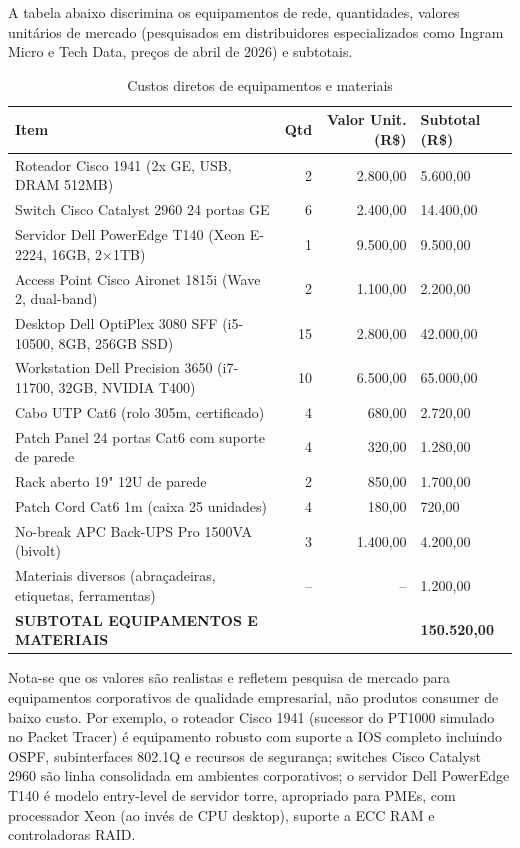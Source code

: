 \documentclass[12pt,a4paper]{article}
\begin{document}
A tabela abaixo discrimina os equipamentos de rede, quantidades, valores unitários de mercado (pesquisados em distribuidores especializados como Ingram Micro e Tech Data, preços de abril de 2026) e subtotais.

\begin{table}[H]
\centering
\caption{Custos diretos de equipamentos e materiais}
\begin{tabularx}{\textwidth}{@{}lrrX@{}}
\toprule
\textbf{Item} & \textbf{Qtd} & \textbf{Valor Unit. (R\$)} & \textbf{Subtotal (R\$)} \\ \midrule
Roteador Cisco 1941 (2x GE, USB, DRAM 512MB) & 2 & 2.800,00 & 5.600,00 \\
Switch Cisco Catalyst 2960 24 portas GE & 6 & 2.400,00 & 14.400,00 \\
Servidor Dell PowerEdge T140 (Xeon E-2224, 16GB, 2×1TB) & 1 & 9.500,00 & 9.500,00 \\
Access Point Cisco Aironet 1815i (Wave 2, dual-band) & 2 & 1.100,00 & 2.200,00 \\
Desktop Dell OptiPlex 3080 SFF (i5-10500, 8GB, 256GB SSD) & 15 & 2.800,00 & 42.000,00 \\
Workstation Dell Precision 3650 (i7-11700, 32GB, NVIDIA T400) & 10 & 6.500,00 & 65.000,00 \\
Cabo UTP Cat6 (rolo 305m, certificado) & 4 & 680,00 & 2.720,00 \\
Patch Panel 24 portas Cat6 com suporte de parede & 4 & 320,00 & 1.280,00 \\
Rack aberto 19" 12U de parede & 2 & 850,00 & 1.700,00 \\
Patch Cord Cat6 1m (caixa 25 unidades) & 4 & 180,00 & 720,00 \\
No-break APC Back-UPS Pro 1500VA (bivolt) & 3 & 1.400,00 & 4.200,00 \\
Materiais diversos (abraçadeiras, etiquetas, ferramentas) & -- & -- & 1.200,00 \\ \midrule
\textbf{SUBTOTAL EQUIPAMENTOS E MATERIAIS} & & & \textbf{150.520,00} \\ \bottomrule
\end{tabularx}
\end{table}

Nota-se que os valores são realistas e refletem pesquisa de mercado para equipamentos corporativos de qualidade empresarial, não produtos consumer de baixo custo. Por exemplo, o roteador Cisco 1941 (sucessor do PT1000 simulado no Packet Tracer) é equipamento robusto com suporte a IOS completo incluindo OSPF, subinterfaces 802.1Q e recursos de segurança; switches Cisco Catalyst 2960 são linha consolidada em ambientes corporativos; o servidor Dell PowerEdge T140 é modelo entry-level de servidor torre, apropriado para PMEs, com processador Xeon (ao invés de CPU desktop), suporte a ECC RAM e controladoras RAID.
\end{document}
